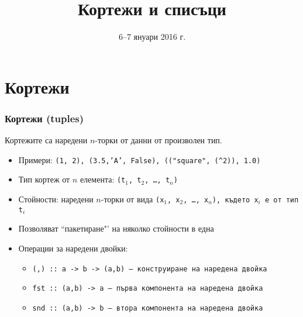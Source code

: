 \documentclass{beamer}
\title{Кортежи и списъци}
\date{6--7 януари 2016 г.}
\begin{document}
\begin{frame}
  \titlepage
\end{frame}


\section{Кортежи}

\begin{frame}
  \frametitle{Кортежи (tuples)}
  Кортежите са наредени $n$-торки от данни от произволен тип.
  \begin{itemize}[<+->]
  \item Примери: \tt{(1, 2)}, \tt{(3.5,'A', False)}, \tt{(("square"{}, (\^{}2)), 1.0)}
  \item Тип кортеж от $n$ елемента: \tt{(t$_1$, t$_2$, \ldots, t$_n$)}
  \item Стойности: наредени $n$-торки от вида \tt{(x$_1$, x$_2$, \ldots, x$_n$)}, където \tt{x$_i$} е от тип \tt{t$_i$}
  \item Позволяват ``пакетиране"' на няколко стойности в една
  \item Операции за наредени двойки:
    \begin{itemize}
    \item \tt{(,) :: a -> b -> (a,b)} --- конструиране на наредена двойка
    \item \tt{fst :: (a,b) -> a} --- първа компонента на наредена двойка
    \item \tt{snd :: (a,b) -> b} --- втора компонента на наредена двойка
    \end{itemize}
  \end{itemize}
\end{frame}
\end{document}
